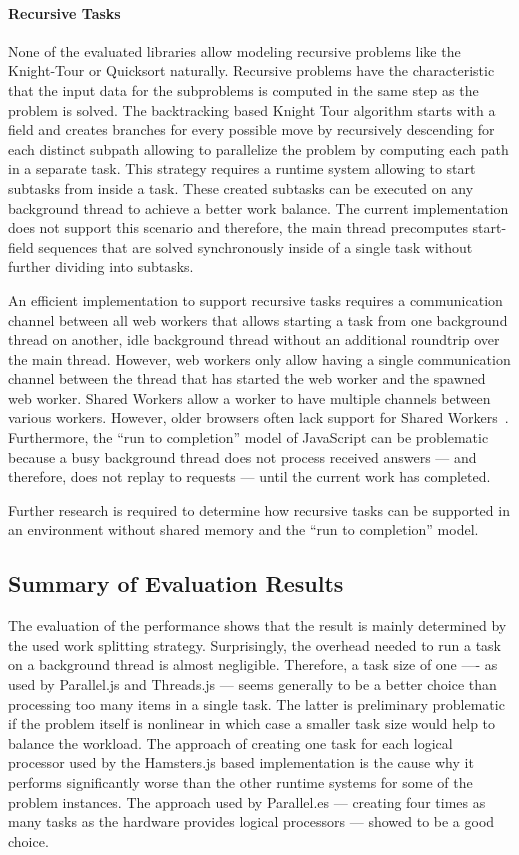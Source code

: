 \paragraph{Recursive Tasks} 
None of the evaluated libraries allow modeling recursive problems like the Knight-Tour or Quicksort naturally. Recursive problems have the characteristic that the input data for the subproblems is computed in the same step as the problem is solved. The backtracking based Knight Tour algorithm starts with a field and creates branches for every possible move by recursively descending for each distinct subpath allowing to parallelize the problem by computing each path in a separate task. This strategy requires a runtime system allowing to start subtasks from inside a task. These created subtasks can be executed on any background thread to achieve a better work balance. The current implementation does not support this scenario and therefore, the main thread precomputes start-field sequences that are solved synchronously inside of a single task without further dividing into subtasks.


An efficient implementation to support recursive tasks requires a communication channel between all web workers that allows starting a task from one background thread on another, idle background thread without an additional roundtrip over the main thread. However, web workers only allow having a single communication channel between the thread that has started the web worker and the spawned web worker. Shared Workers allow a worker to have multiple channels between various workers. However, older browsers often lack support for Shared Workers~\cite[section 4.6.4]{w3cWebWorker}. Furthermore, the \enquote{run to completion} model of JavaScript can be problematic because a busy background thread does not process received answers --- and therefore, does not replay to requests --- until the current work has completed.

Further research is required to determine how recursive tasks can be supported in an environment without shared memory and the \enquote{run to completion} model.

\subsection{Summary of Evaluation Results}
The evaluation of the performance shows that the result is mainly determined by the used work splitting strategy. Surprisingly, the overhead needed to run a task on a background thread is almost negligible. Therefore, a task size of one  ---- as used by Parallel.js and Threads.js --- seems generally to be a better choice than processing too many items in a single task. The latter is preliminary problematic if the problem itself is nonlinear in which case a smaller task size would help to balance the workload. The approach of creating one task for each logical processor used by the Hamsters.js based implementation is the cause why it performs significantly worse than the other runtime systems for some of the problem instances. The approach used by Parallel.es --- creating four times as many tasks as the hardware provides logical processors --- showed to be a good choice. 

